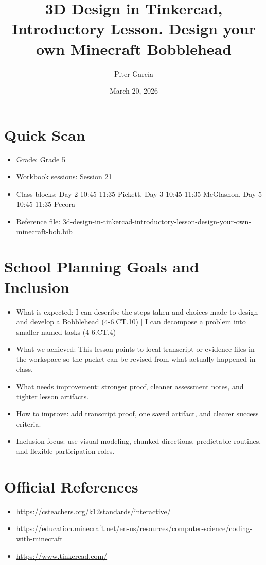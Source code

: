 \documentclass[11pt]{article}
\title{3D Design in Tinkercad, Introductory Lesson. Design your own Minecraft Bobblehead}
\author{Piter Garcia}
\date{March 20, 2026}
\begin{document}
    \maketitle
    \section*{Quick Scan}
    \begin{itemize}[leftmargin=*]
    \item Grade: Grade 5
    \item Workbook sessions: Session 21
    \item Class blocks: Day 2 10:45-11:35 Pickett, Day 3 10:45-11:35 McGlashon, Day 5 10:45-11:35 Pecora
    \item Reference file: 3d-design-in-tinkercad-introductory-lesson-design-your-own-minecraft-bob.bib
    \end{itemize}
    \section*{School Planning Goals and Inclusion}
    \begin{itemize}[leftmargin=*]
    \item What is expected: I can describe the steps taken and choices made to design and develop a Bobblehead (4-6.CT.10) | I can decompose a problem into smaller named tasks (4-6.CT.4)
    \item What we achieved: This lesson points to local transcript or evidence files in the workspace so the packet can be revised from what actually happened in class.
    \item What needs improvement: stronger proof, cleaner assessment notes, and tighter lesson artifacts.
    \item How to improve: add transcript proof, one saved artifact, and clearer success criteria.
    \item Inclusion focus: use visual modeling, chunked directions, predictable routines, and flexible participation roles.
    \end{itemize}
    \section*{Official References}
    \begin{itemize}[leftmargin=*]
    \item \url{https://csteachers.org/k12standards/interactive/}
\item \url{https://education.minecraft.net/en-us/resources/computer-science/coding-with-minecraft}
\item \url{https://www.tinkercad.com/}

    \end{itemize}
    
\end{document}
